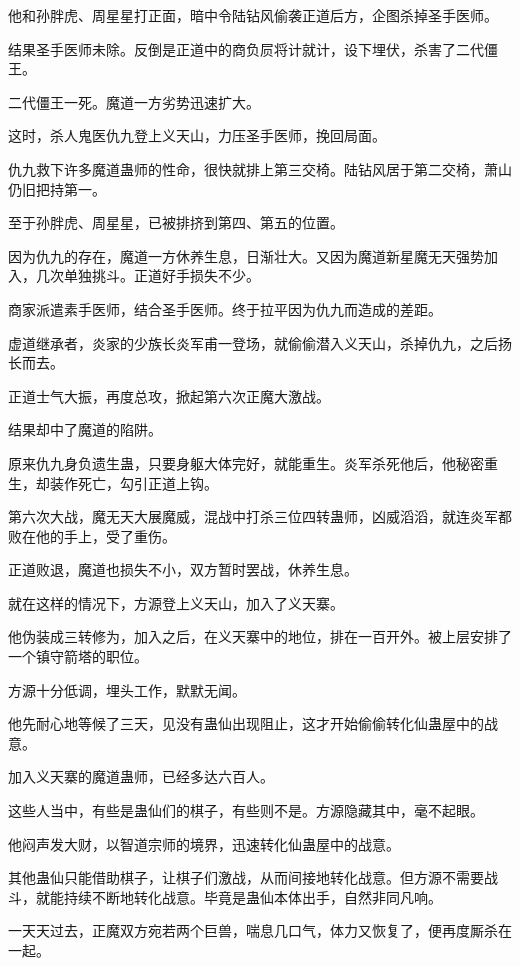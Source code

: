 \begin{this_body}
他和孙胖虎、周星星打正面，暗中令陆钻风偷袭正道后方，企图杀掉圣手医师。

结果圣手医师未除。反倒是正道中的商负屃将计就计，设下埋伏，杀害了二代僵王。

二代僵王一死。魔道一方劣势迅速扩大。

这时，杀人鬼医仇九登上义天山，力压圣手医师，挽回局面。

仇九救下许多魔道蛊师的性命，很快就排上第三交椅。陆钻风居于第二交椅，萧山仍旧把持第一。

至于孙胖虎、周星星，已被排挤到第四、第五的位置。

因为仇九的存在，魔道一方休养生息，日渐壮大。又因为魔道新星魔无天强势加入，几次单独挑斗。正道好手损失不少。

商家派遣素手医师，结合圣手医师。终于拉平因为仇九而造成的差距。

虚道继承者，炎家的少族长炎军甫一登场，就偷偷潜入义天山，杀掉仇九，之后扬长而去。

正道士气大振，再度总攻，掀起第六次正魔大激战。

结果却中了魔道的陷阱。

原来仇九身负遗生蛊，只要身躯大体完好，就能重生。炎军杀死他后，他秘密重生，却装作死亡，勾引正道上钩。

第六次大战，魔无天大展魔威，混战中打杀三位四转蛊师，凶威滔滔，就连炎军都败在他的手上，受了重伤。

正道败退，魔道也损失不小，双方暂时罢战，休养生息。

就在这样的情况下，方源登上义天山，加入了义天寨。

他伪装成三转修为，加入之后，在义天寨中的地位，排在一百开外。被上层安排了一个镇守箭塔的职位。

方源十分低调，埋头工作，默默无闻。

他先耐心地等候了三天，见没有蛊仙出现阻止，这才开始偷偷转化仙蛊屋中的战意。

加入义天寨的魔道蛊师，已经多达六百人。

这些人当中，有些是蛊仙们的棋子，有些则不是。方源隐藏其中，毫不起眼。

他闷声发大财，以智道宗师的境界，迅速转化仙蛊屋中的战意。

其他蛊仙只能借助棋子，让棋子们激战，从而间接地转化战意。但方源不需要战斗，就能持续不断地转化战意。毕竟是蛊仙本体出手，自然非同凡响。

一天天过去，正魔双方宛若两个巨兽，喘息几口气，体力又恢复了，便再度厮杀在一起。


\end{this_body}
